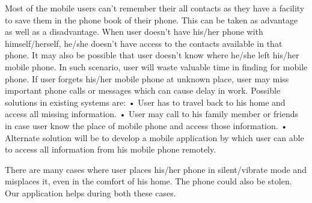 \hspace{0.9cm}Most of the mobile users can’t remember their all contacts as they have a facility to save them in the phone book of their phone. This can be taken as advantage as well as a disadvantage. When user doesn’t have his/her phone with himself/herself, he/she doesn’t have access to the contacts available in that phone. It may also be possible that user doesn’t know where he/she left his/her mobile phone. In such scenario, user will waste valuable time in finding for mobile phone. If user forgets his/her mobile phone at unknown place, user may miss important phone calls or messages which can cause delay in work. Possible solutions in existing systems are: 
•	User has to travel back to his home and access all missing information. 
•	User may call to his family member or friends in case user know the place of mobile phone and access those information. 
•	Alternate solution will be to develop a mobile application by which user can able to access all information from his mobile phone remotely.

There are many cases where user places his/her phone in silent/vibrate mode and misplaces it, even in the comfort of his home. The phone could also be stolen. Our application helps during both these cases.
